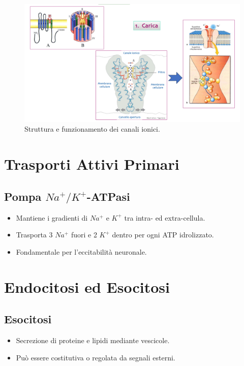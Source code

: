 \documentclass{article}
\begin{document}
\begin{figure}[h]
    \centering
    \includegraphics[width=1\textwidth]{Neuroscienze 2024-2025/Modulo I/Immagini Modulo I/Screenshot 2025-06-21 at 17-11-44 4. Gradiente elettrochimico_Diffusione facilitata_trasporti.pdf.png}
    \caption{Struttura e funzionamento dei canali ionici.}
    \label{fig:canali}
\end{figure}

\section{Trasporti Attivi Primari}
\subsection{Pompa \(Na^+/K^+\)-ATPasi}
\begin{itemize}
    \item Mantiene i gradienti di \(Na^+\) e \(K^+\) tra intra- ed extra-cellula.
    \item Trasporta 3 \(Na^+\) fuori e 2 \(K^+\) dentro per ogni ATP idrolizzato.
    \item Fondamentale per l'eccitabilità neuronale.
\end{itemize}

\section{Endocitosi ed Esocitosi}
\subsection{Esocitosi}
\begin{itemize}
    \item Secrezione di proteine e lipidi mediante vescicole.
    \item Può essere costitutiva o regolata da segnali esterni.
\end{itemize}
\end{document}
